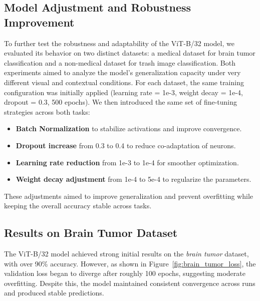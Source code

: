 \documentclass[12pt]{article}
\begin{document}
\subsection{Model Adjustment and Robustness Improvement}

To further test the robustness and adaptability of the ViT-B/32 model, we evaluated its behavior on two distinct datasets: 
a medical dataset for brain tumor classification and a non-medical dataset for trash image classification. 
Both experiments aimed to analyze the model’s generalization capacity under very different visual and contextual conditions.
For each dataset, the same training configuration was initially applied (learning rate = 1e-3, weight decay = 1e-4, dropout = 0.3, 500 epochs). 
We then introduced the same set of fine-tuning strategies across both tasks:


\begin{itemize}
    \item \textbf{Batch Normalization} to stabilize activations and improve convergence.
    \item \textbf{Dropout increase} from 0.3 to 0.4 to reduce co-adaptation of neurons.
    \item \textbf{Learning rate reduction} from 1e-3 to 1e-4 for smoother optimization.
    \item \textbf{Weight decay adjustment} from 1e-4 to 5e-4 to regularize the parameters.
\end{itemize}

These adjustments aimed to improve generalization and prevent overfitting while keeping the overall accuracy stable across tasks.

\subsection{Results on Brain Tumor Dataset}

The ViT-B/32 model achieved strong initial results on the \textit{brain tumor} dataset, 
with over 90\% accuracy. However, as shown in Figure~\ref{fig:brain_tumor_loss}, 
the validation loss began to diverge after roughly 100 epochs, suggesting moderate overfitting. 
Despite this, the model maintained consistent convergence across runs and produced stable predictions.
\end{document}
